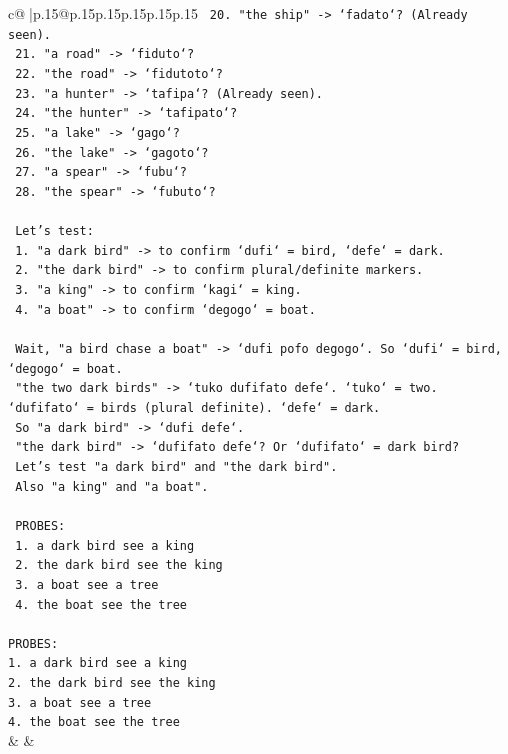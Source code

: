 \documentclass{article}
\begin{document}
{\begin{supertabular}{c@{$\;$}|p{.15\linewidth}@{}p{.15\linewidth}p{.15\linewidth}p{.15\linewidth}p{.15\linewidth}p{.15\linewidth}}
{{{\texttt{    20. "the ship" {-}> `fadato`? (Already seen).} \\
\texttt{    21. "a road" {-}> `fiduto`?} \\
\texttt{    22. "the road" {-}> `fidutoto`?} \\
\texttt{    23. "a hunter" {-}> `tafipa`? (Already seen).} \\
\texttt{    24. "the hunter" {-}> `tafipato`?} \\
\texttt{    25. "a lake" {-}> `gago`?} \\
\texttt{    26. "the lake" {-}> `gagoto`?} \\
\texttt{    27. "a spear" {-}> `fubu`?} \\
\texttt{    28. "the spear" {-}> `fubuto`?} \\
\\ 
\texttt{    Let's test:} \\
\texttt{    1. "a dark bird" {-}> to confirm `dufi` = bird, `defe` = dark.} \\
\texttt{    2. "the dark bird" {-}> to confirm plural/definite markers.} \\
\texttt{    3. "a king" {-}> to confirm `kagi` = king.} \\
\texttt{    4. "a boat" {-}> to confirm `degogo` = boat.} \\
\\ 
\texttt{    Wait, "a bird chase a boat" {-}> `dufi pofo degogo`. So `dufi` = bird, `degogo` = boat.} \\
\texttt{    "the two dark birds" {-}> `tuko dufifato defe`. `tuko` = two. `dufifato` = birds (plural definite). `defe` = dark.} \\
\texttt{    So "a dark bird" {-}> `dufi defe`.} \\
\texttt{    "the dark bird" {-}> `dufifato defe`? Or `dufifato` = dark bird?} \\
\texttt{    Let's test "a dark bird" and "the dark bird".} \\
\texttt{    Also "a king" and "a boat".} \\
\\ 
\texttt{    PROBES:} \\
\texttt{    1. a dark bird see a king} \\
\texttt{    2. the dark bird see the king} \\
\texttt{    3. a boat see a tree} \\
\texttt{    4. the boat see the tree} \\
\\ 
\texttt{PROBES:} \\
\texttt{1. a dark bird see a king} \\
\texttt{2. the dark bird see the king} \\
\texttt{3. a boat see a tree} \\
\texttt{4. the boat see the tree} \\
            }
        }
    }
    & & \\ \\


\end{supertabular}}
\end{document}
